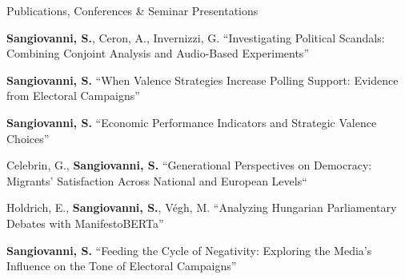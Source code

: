 \documentclass{cv} %
\begin{document}
\begin{rSection}{Publications, Conferences \& Seminar Presentations}
\subtitle{Working Papers}

\begin{rWPSection}
{\textbf{Sangiovanni, S.}, Ceron, A., Invernizzi, G. “Investigating Political Scandals: Combining Conjoint Analysis and Audio-Based Experiments”} 
\end{rWPSection}
\begin{rWPSection}       
{\textbf{Sangiovanni, S.} “When Valence Strategies Increase Polling Support: Evidence from Electoral Campaigns”} 
\end{rWPSection}
\begin{rWPSection}       
{\textbf{Sangiovanni, S.} “Economic Performance Indicators and Strategic Valence Choices”} 
\end{rWPSection}
\begin{rWPSection}
{Celebrin, G., \textbf{Sangiovanni, S.} “Generational Perspectives on Democracy: Migrants' Satisfaction Across National and European Levels“}    
\end{rWPSection}    
\begin{rWPSection}    
{Holdrich, E., \textbf{Sangiovanni, S.}, Végh, M. “Analyzing Hungarian Parliamentary Debates with ManifestoBERTa”} 
\end{rWPSection}
\begin{rWPSection}
{\textbf{Sangiovanni, S.} “Feeding the Cycle of Negativity: Exploring the Media's Influence on the Tone of Electoral Campaigns”}
\end{rWPSection}
\end{rSection}
\end{document}
